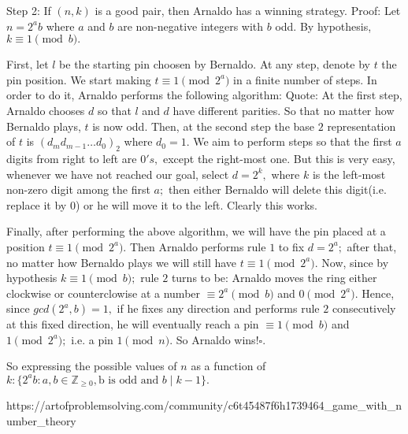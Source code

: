 {    Step 2: If $(n,k)$ is a good pair, then Arnaldo has a winning strategy.
    Proof:
    Let $n=2^ab$ where $a$ and $b$ are non-negative integers with $b$ odd. By hypothesis, $k \equiv 1 \pmod b.$

    First, let $l$ be the starting pin choosen by Bernaldo. At any step, denote by $t$ the pin position. We start making $t \equiv 1 \pmod {2^a}$ in a finite number of steps. In order to do it, Arnaldo performs the following algorithm:
    Quote:
    At the first step, Arnaldo chooses $d$ so that $l$ and $d$ have different parities. So that no matter how Bernaldo plays, $t$ is now odd. Then, at the second step the base $2$ representation of $t$ is ${(d_md_{m-1}\dots d_0)}_2$ where $d_0 = 1.$ We aim to perform steps so that the first $a$ digits from right to left are $0's,$ except the right-most one. But this is very easy, whenever we have not reached our goal, select $d=2^k,$ where $k$ is the left-most non-zero digit among the first $a;$ then either Bernaldo will delete this digit(i.e. replace it by $0$) or he will move it to the left. Clearly this works.

    Finally, after performing the above algorithm, we will have the pin placed at a position $t\equiv 1\pmod {2^a}.$ Then Arnaldo performs rule $1$ to fix $d=2^a;$ after that, no matter how Bernaldo plays we will still have $t \equiv 1 \pmod {2^a}.$ Now, since by hypothesis $k\equiv 1 \pmod b;$ rule $2$ turns to be: Arnaldo moves the ring either clockwise or counterclowise at a number $\equiv 2^a \pmod b$ and $0\pmod 2^a.$ Hence, since $gcd(2^a,b)=1,$ if he fixes any direction and performs rule $2$ consecutively at this fixed direction, he will eventually reach a pin $\equiv 1 \pmod {b}$ and $1 \pmod {2^a};$ i.e. a pin $1 \pmod {n}.$ So Arnaldo wins!$\square.$


    So expressing the possible values of $n$ as a function of $k: \{2^a b : a,b \in {\mathbb{Z}}_{\ge 0}, \text{b is odd and } b \mid k-1 \}.$
    }{%
    https://artofproblemsolving.com/community/c6t45487f6h1739464_game_with_number_theory
}
